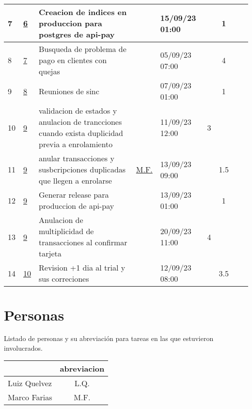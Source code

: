 \documentclass{article}
\begin{document}
\begin{longtable}{|m{0.5cm}|m{1.2cm}|p{5cm}|m{1.5cm}|m{1.5cm}||c|c|c|c||}
                 \label{7}7  &  \hyperref[6]{\color{blue}6}  & Creacion de indices en produccion para postgres de api-pay &  
                 & 15/09/23 01:00  &  & 1 &  & \\ \hline 

                 \label{8}8  &  \hyperref[7]{\color{blue}7}  & Busqueda de problema de pago en clientes con quejas &  
                 & 05/09/23 07:00  &  & 4 &  & \\ \hline 

                 \label{9}9  &  \hyperref[8]{\color{blue}8}  & Reuniones de sinc &  
                 & 07/09/23 01:00  &  & 1 &  & \\ \hline 

                 \label{10}10  &  \hyperref[9]{\color{blue}9}  & validacion de estados y anulacion de trancciones cuando exista duplicidad previa a enrolamiento &  
                 & 11/09/23 12:00  & 3 &  &  & \\ \hline 

                 \label{11}11  &  \hyperref[9]{\color{blue}9}  & anular transacciones y susbcripciones duplicadas que llegen a enrolarse &  
                  \hyperref[M.F.]{\color{blue}M.F.}  & 13/09/23 09:00  &  & 1.5 &  & \\ \hline 

                 \label{12}12  &  \hyperref[9]{\color{blue}9}  & Generar release para produccion de api-pay &  
                 & 13/09/23 01:00  &  & 1 &  & \\ \hline 

                 \label{13}13  &  \hyperref[9]{\color{blue}9}  & Anulacion de multiplicidad de transacciones al confirmar tarjeta &  
                 & 20/09/23 11:00  & 4 &  &  & \\ \hline 

                 \label{14}14  &  \hyperref[10]{\color{blue}10}  & Revision +1 dia al trial y sus correciones &  
                 & 12/09/23 08:00  &  & 3.5 &  & \\ \hline 

    \end{longtable} 
 \newpage
\section{Personas}
Listado de personas y su abreviación para tareas en las que estuvieron involucrados.
\begin{table}[htbp]
    \centering
    \begin{tabular}{|p{6cm}|c|}
        \hline
        \centering{\textbf{Nombre}} & \textbf{abreviacion} \\ \hline
        Luiz Quelvez &  \label{L.Q.}L.Q.  \\ \hline
        Marco Farias &  \label{M.F.}M.F.  \\ \hline
    \end{tabular}
\end{table} 
 
\end{document}
